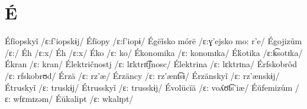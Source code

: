 \chapter{É}

Éfïopskyǐ /ɛ:f’iopskɨj/
Éfïopy /ɛ:f’iopɨ/
Égëǐsko mórë /ɛ:ɣ’ejsko mo: r’e/
Égojizům /ɛ:/
Éh /ɛ:x/
Éh /ɛ:x/
Éko /ɛ: ko/
Ékonomika /ɛ: konomɪka/
Éḱotika /ɛ:k͡sotɪka/
Ékran /ɛ: kran/
Élektričnostj /ɛ: lɛktrɪt͡ʃnosc/
Élektrina /ɛ: lɛktrɪna/
Érfskobrôd /ɛ: rfskobrʊd/
Érzä /ɛ: rz’æ/
Érzäncy /ɛ: rz’ænt͡sɨ/
Érzänskyǐ /ɛ: rz’ænskɨj/
Étruskyǐ /ɛ: truskɨj/
Étrusskyǐ /ɛ: trusskɨj/
Évolücïä /ɛ: voʎʊ̈t͡s’iæ/
Éŭfemizům /ɛ: wfɛmɪzəm/
Éŭkalipt /ɛ: wkalɪpt/